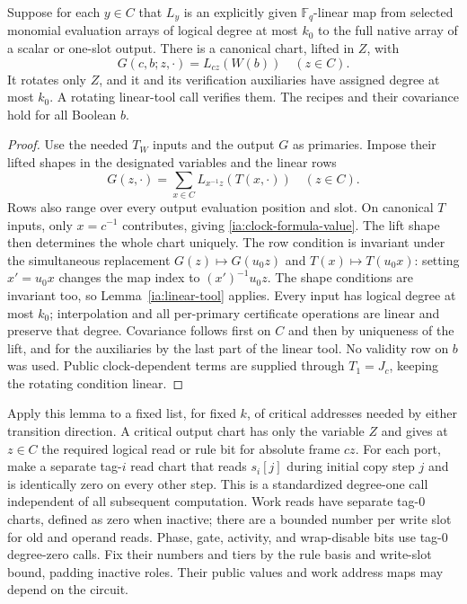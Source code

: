 \begin{lemma}\label{ia:clock-formula}
Suppose for each $y\in C$ that $L_y$ is an explicitly given
$\mathbb F_q$-linear map from selected monomial evaluation arrays
of logical degree at most $k_0$ to the full native array of a scalar
or one-slot output.  There is a canonical chart, lifted in $Z$, with
\begin{equation}
 G(c,b;z,\cdot)=L_{cz}(W(b))\quad(z\in C).         \label{ia:clock-formula-value}
\end{equation}
It rotates only $Z$, and it and its verification auxiliaries have
assigned degree at most $k_0$.  A rotating linear-tool call verifies
them.  The recipes and their covariance hold for all Boolean $b$.
\end{lemma}

\begin{proof}
Use the needed $T_W$ inputs and the output $G$ as primaries.  Impose
their lifted shapes in the designated variables and the linear rows
\begin{equation}
 G(z,\cdot)=\sum_{x\in C}L_{x^{-1}z}(T(x,\cdot))
 \quad(z\in C).                                  \label{ia:clock-convolution}
\end{equation}
Rows also range over every output evaluation position and slot.
On canonical $T$ inputs, only $x=c^{-1}$ contributes, giving
\eqref{ia:clock-formula-value}.  The lift shape then determines the
whole chart uniquely.  The row condition is invariant under the
simultaneous replacement $G(z)\mapsto G(u_0z)$ and
$T(x)\mapsto T(u_0x)$: setting $x'=u_0x$ changes the map index to
$(x')^{-1}u_0z$.  The shape conditions are invariant too, so
Lemma~\ref{ia:linear-tool} applies.  Every input has logical degree
at most $k_0$; interpolation and all per-primary certificate operations
are linear and preserve that degree.  Covariance follows first on
$C$ and then by uniqueness of the lift, and for the auxiliaries by
the last part of the linear tool.  No validity row on $b$ was used.
Public clock-dependent terms are supplied through $T_1=J_c$, keeping
the rotating condition linear.
\end{proof}

Apply this lemma to a fixed list, for fixed $k$, of critical addresses
needed by either transition direction.  A critical output chart has
only the variable $Z$ and gives at $z\in C$ the required logical read
or rule bit for absolute frame $cz$.  For each port, make a separate
tag-$i$ read chart that reads $s_i[j]$ during initial copy step $j$
and is identically zero on every other step.  This is a standardized
degree-one call independent of all subsequent computation.  Work
reads have separate tag-$0$ charts, defined as zero when inactive;
there are a bounded number per write slot for old and operand reads.
Phase, gate, activity, and wrap-disable bits use tag-$0$ degree-zero
calls.  Fix their numbers and tiers by the rule basis and write-slot
bound, padding inactive roles.  Their public values and work address
maps may depend on the circuit.

